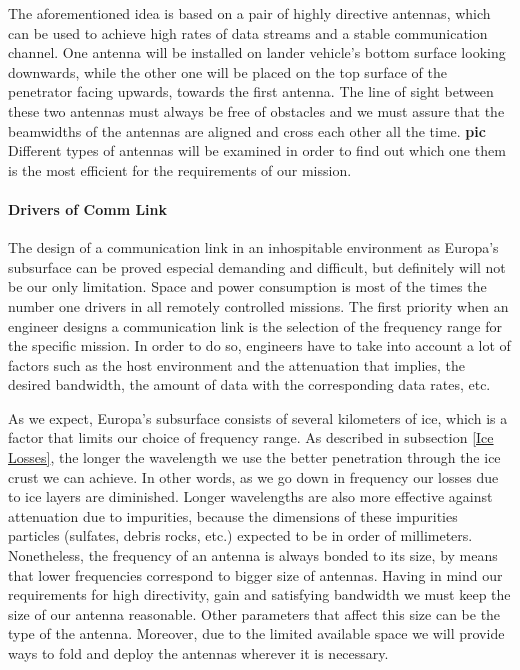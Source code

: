 The aforementioned idea is based on a pair of highly directive antennas, which can be used to achieve high rates of data streams and a stable communication channel. One antenna will be installed on lander vehicle's bottom surface looking downwards, while the other one will be placed on the top surface of the penetrator facing upwards, towards the first antenna. The line of sight between these two antennas must always be free of obstacles and we must assure that the beamwidths of the antennas are aligned and cross each other all the time. \textbf{pic} Different types of antennas will be examined in order to find out which one them is the most efficient for the requirements of our mission.

\paragraph{Drivers of Comm Link}
The design of a communication link in an inhospitable environment as Europa's subsurface can be proved especial demanding and difficult, but definitely will not be our only limitation. Space and power consumption is most of the times the number one drivers in all remotely controlled missions. The first priority when an engineer designs a communication link is the selection of the frequency range for the specific mission. In order to do so, engineers have to take into account a lot of factors such as the host environment and the attenuation that implies, the desired bandwidth, the amount of data with the corresponding data rates, etc. 

As we expect, Europa's subsurface consists of several kilometers of ice, which is a factor that limits our choice of frequency range. As described in subsection \ref{Ice Losses}, the longer the wavelength we use the better penetration through the ice crust we can achieve. In other words, as we go down in frequency our losses due to ice layers are diminished. Longer wavelengths are also more effective against attenuation due to impurities, because the dimensions of these impurities particles (sulfates, debris rocks, etc.) expected to be in order of millimeters. Nonetheless, the frequency of an antenna is always bonded to its size, by means that lower frequencies correspond to bigger size of antennas. Having in mind our requirements for high directivity, gain and satisfying bandwidth we must keep the size of our antenna reasonable. Other parameters that affect this size can be the type of the antenna. Moreover, due to the limited available space we will provide ways to fold and deploy the antennas wherever it is necessary.  

